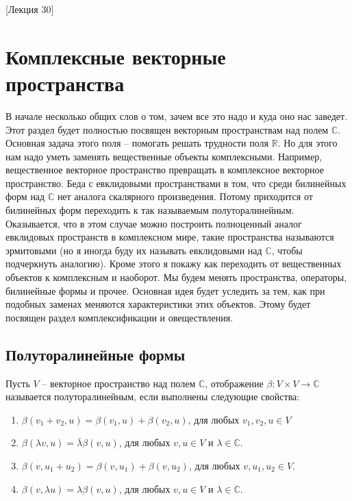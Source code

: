 [Лекция 30]

\newpage
\section{Комплексные векторные пространства}

В начале несколько общих слов о том, зачем все это надо и куда оно нас заведет. Этот раздел будет полностью посвящен векторным пространствам над полем $\mathbb C$. Основная задача этого поля -- помогать решать трудности поля $\mathbb R$. Но для этого нам надо уметь заменять вещественные объекты комплексными. Например, вещественное векторное пространство превращать в комплексное векторное пространство. Беда с евклидовыми пространствами в том, что среди билинейных форм над $\mathbb C$ нет аналога скалярного произведения. Потому приходится от билинейных форм переходить к так называемым полуторалинейным. Оказывается, что в этом случае можно построить полноценный аналог евклидовых пространств в комплексном мире, такие пространства называются эрмитовыми (но я иногда буду их называть евклидовыми над $\mathbb C$, чтобы подчеркнуть аналогию). Кроме этого я покажу как переходить от вещественных объектов к комплексным и наоборот. Мы будем менять пространства, операторы, билинейные формы и прочее. Основная идея будет уследить за тем, как при подобных заменах меняются характеристики этих объектов. Этому будет посвящен раздел комплексификации и овеществления.

\subsection{Полуторалинейные формы}

\begin{definition}
Пусть $V$ -- векторное пространство над полем $\mathbb C$, отображение $\beta \colon V\times V\to \mathbb C$ называется полуторалинейным, если выполнены следующие свойства:
\begin{enumerate}
\item $\beta(v_1+v_2, u) = \beta(v_1,u) + \beta(v_2, u)$, для любых $v_1, v_2, u\in V$
\item $\beta(\lambda v, u) = \bar \lambda \beta(v, u)$, для любых $v, u \in V$ и $\lambda\in \mathbb C$.
\item $\beta(v, u_1 + u_2) = \beta(v, u_1) + \beta(v, u_2)$, для любых $v, u_1, u_2\in V$.
\item $\beta(v, \lambda u) = \lambda\beta(v, u)$, для любых $v,u \in V$ и $\lambda \in \mathbb C$.
\end{enumerate}
\end{definition}

